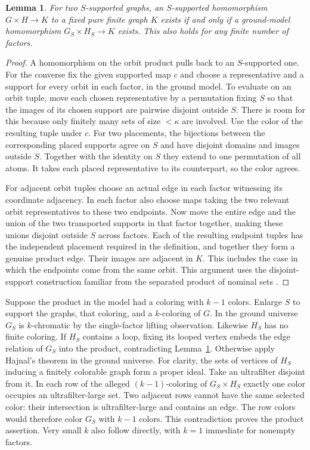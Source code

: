 \documentclass[11pt]{article}
\newtheorem{lemma}[theorem]{Lemma}
\begin{document}
\begin{lemma}\label{orbits}
For two $S$-supported graphs, an $S$-supported homomorphism $G\times H\to K$ to a fixed pure finite graph $K$ exists if and only if a ground-model homomorphism $G_S\times H_S\to K$ exists. This also holds for any finite number of factors.
\end{lemma}
\begin{proof}
A homomorphism on the orbit product pulls back to an $S$-supported one. For the converse fix the given supported map $c$ and choose a representative and a support for every orbit in each factor, in the ground model. To evaluate on an orbit tuple, move each chosen representative by a permutation fixing $S$ so that the images of its chosen support are pairwise disjoint outside $S$. There is room for this because only finitely many sets of size $<\kappa$ are involved. Use the color of the resulting tuple under $c$. For two placements, the bijections between the corresponding placed supports agree on $S$ and have disjoint domains and images outside $S$. Together with the identity on $S$ they extend to one permutation of all atoms. It takes each placed representative to its counterpart, so the color agrees.

For adjacent orbit tuples choose an actual edge in each factor witnessing its coordinate adjacency. In each factor also choose maps taking the two relevant orbit representatives to these two endpoints. Now move the entire edge and the union of the two transported supports in that factor together, making these unions disjoint outside $S$ across factors. Each of the resulting endpoint tuples has the independent placement required in the definition, and together they form a genuine product edge. Their images are adjacent in $K$. This includes the case in which the endpoints come from the same orbit. This argument uses the disjoint-support construction familiar from the separated product of nominal sets \cite[Section 3.4]{pitts}.
\end{proof}

Suppose the product in the model had a coloring with $k-1$ colors. Enlarge $S$ to support the graphs, that coloring, and a $k$-coloring of $G$. In the ground universe $G_S$ is $k$-chromatic by the single-factor lifting observation. Likewise $H_S$ has no finite coloring. If $H_S$ contains a loop, fixing its looped vertex embeds the edge relation of $G_S$ into the product, contradicting Lemma~\ref{orbits}. Otherwise apply Hajnal's theorem in the ground universe. For clarity, the sets of vertices of $H_S$ inducing a finitely colorable graph form a proper ideal. Take an ultrafilter disjoint from it. In each row of the alleged $(k-1)$-coloring of $G_S\times H_S$ exactly one color occupies an ultrafilter-large set. Two adjacent rows cannot have the same selected color: their intersection is ultrafilter-large and contains an edge. The row colors would therefore color $G_S$ with $k-1$ colors. This contradiction proves the product assertion. Very small $k$ also follow directly, with $k=1$ immediate for nonempty factors.
\end{document}
